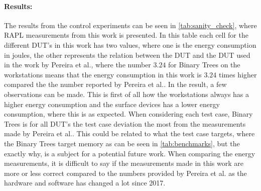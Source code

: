 \paragraph*{Results:} The results from the control experiments can be seen in \cref{tab:sanity_check}, where RAPL measurements from this work is presented. In this table each cell for the different DUT's in this work has two values, where one is the energy consumption in joules, the other represents the relation between the DUT and the DUT used in the work by Pereira et al.\cite[]{Pereira2017}, where the number $3.24$ for Binary Trees on the workstations means that the energy consumption in this work is $3.24$ times higher compared the the number reported by Pereira et al.\cite[]{Pereira2017}. In the result, a few observations can be made. This is first of all how the workstations always has a higher energy consumption and the surface devices has a lower energy consumption, where this is as expected. When considering each test case, Binary Trees is for all DUT's the test case deviation the most from the measurements made by Pereira et al.\cite[]{Pereira2017}. This could be related to what the test case targets, where the Binary Trees target memory as can be seen in \cref{tab:benchmarks}, but the exactly why, is a subject for a potential future work. When comparing the energy measurements, it is difficult to say if the measurements made in this work are more or less correct compared to the numbers provided by Pereira et al.\cite[]{Pereira2017} as the hardware and software has changed a lot since 2017.
